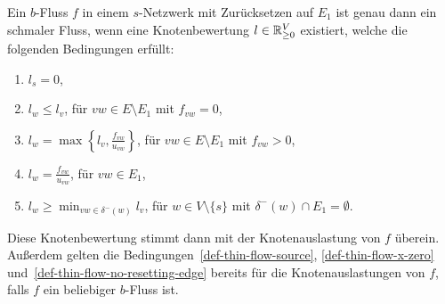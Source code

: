 \begin{lemma}\label{lemma-thin-flow-t-def}
	Ein $b$-Fluss $f$ in einem $s$-Netzwerk mit Zurücksetzen auf $E_1$ ist genau dann ein schmaler Fluss, wenn eine Knotenbewertung $l\in\mathbb{R}_{\geq 0}^V$ existiert, welche die folgenden Bedingungen erfüllt:
	\begin{enumerate}[label=(T\arabic*)]
		\item\label{def-thin-flow-source} $\displaystyle l_s = 0$,
		\item\label{def-thin-flow-x-zero} $\displaystyle l_w \leq l_v$, \tabto{4.5cm} für $vw\in E \setminus E_1$ mit $f_{vw}=0$,
		\item\label{def-thin-flow-x-positive} $\displaystyle l_w = \max\left\{ l_v, \frac{f_{vw}}{u_{vw}} \right\}$, \tabto{4.5cm} für $vw\in E\setminus E_1$ mit $f_{vw} > 0$,
		\item\label{def-thin-flow-resetting-edge} $\displaystyle l_w = \frac{f_{vw}}{u_{vw}}$, \tabto{4.5cm} für $vw\in E_1$,
		\item\label{def-thin-flow-no-resetting-edge} $\displaystyle l_w \geq \min_{vw\in \delta^-(w)} l_v$, \tabto{4.5cm} für $w\in V\setminus \{ s \}$ mit $\delta^-(w)\cap E_1 = \emptyset$.
	\end{enumerate}
	Diese Knotenbewertung stimmt dann mit der Knotenauslastung von $f$ überein.
	Außerdem gelten die Bedingungen~\ref{def-thin-flow-source}, \ref{def-thin-flow-x-zero} und~\ref{def-thin-flow-no-resetting-edge} bereits für die Knotenauslastungen von $f$, falls $f$ ein beliebiger $b$-Fluss ist.
\end{lemma}
